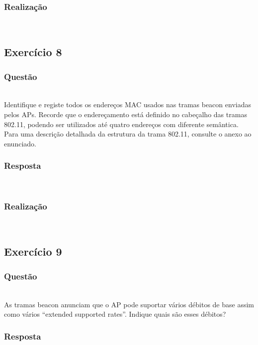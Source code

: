 \documentclass{llncs}
\begin{document}
\subsubsection{Realização}\rule[-10pt]{0pt}{10pt}\\



\clearpage
\subsection{Exercício 8}
\subsubsection{Questão}\rule[-10pt]{0pt}{10pt}\\

Identifique e registe todos os endereços MAC usados nas tramas beacon enviadas pelos APs. Recorde que o endereçamento está definido no cabeçalho das tramas 802.11, podendo ser utilizados até quatro endereços com diferente semântica. Para uma descrição detalhada da estrutura da trama 802.11, consulte o anexo ao enunciado.

\subsubsection{Resposta}\rule[-10pt]{0pt}{10pt}\\



\subsubsection{Realização}\rule[-10pt]{0pt}{10pt}\\



\clearpage
\subsection{Exercício 9}
\subsubsection{Questão}\rule[-10pt]{0pt}{10pt}\\

As tramas beacon anunciam que o AP pode suportar vários débitos de base assim como vários “extended supported rates”. Indique quais são esses débitos?

\subsubsection{Resposta}\rule[-10pt]{0pt}{10pt}\\
\end{document}
